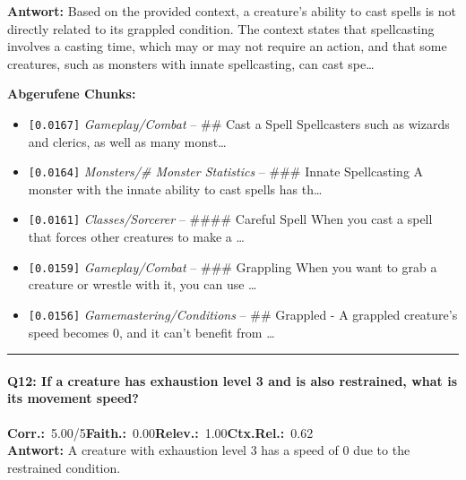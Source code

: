 \noindent\textbf{Antwort:} Based on the provided context, a creature's ability to cast spells is not directly related to its grappled condition. The context states that spellcasting involves a casting time, which may or may not require an action, and that some creatures, such as monsters with innate spellcasting, can cast spe\ldots

\noindent\textbf{Abgerufene Chunks:}
\begin{itemize}[noitemsep, topsep=2pt]
  \item[\textbf{\#1}] \texttt{[0.0167]} \textit{Gameplay/Combat} -- \#\# Cast a Spell  Spellcasters such as wizards and clerics, as well as many monst\ldots
  \item[\textbf{\#2}] \texttt{[0.0164]} \textit{Monsters/# Monster Statistics} -- \#\#\# Innate Spellcasting  A monster with the innate ability to cast spells has th\ldots
  \item[\textbf{\#3}] \texttt{[0.0161]} \textit{Classes/Sorcerer} -- \#\#\#\# Careful Spell  When you cast a spell that forces other creatures to make a \ldots
  \item[\textbf{\#4}] \texttt{[0.0159]} \textit{Gameplay/Combat} -- \#\#\# Grappling  When you want to grab a creature or wrestle with it, you can use \ldots
  \item[\textbf{\#5}] \texttt{[0.0156]} \textit{Gamemastering/Conditions} -- \#\# Grappled  - A grappled creature's speed becomes 0, and it can't benefit from \ldots
\end{itemize}
\vspace{4pt}
\hrule
\vspace{6pt}

\paragraph{Q12: If a creature has exhaustion level 3 and is also restrained, what is its movement speed?}
\noindent \textbf{Corr.:}~5.00/5\quad \textbf{Faith.:}~0.00\quad \textbf{Relev.:}~1.00\quad \textbf{Ctx.Rel.:}~0.62\\

\noindent\textbf{Antwort:} A creature with exhaustion level 3 has a speed of 0 due to the restrained condition.

